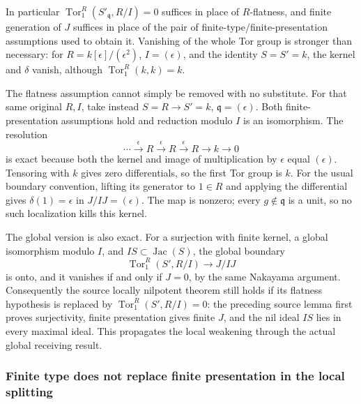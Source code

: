 In particular \(\operatorname{Tor}_1^R(S'_{\mathfrak q},R/I)=0\) suffices in place of \(R\)-flatness, and finite generation of \(J\) suffices in place of the pair of finite-type/finite-presentation assumptions used to obtain it. Vanishing of the whole Tor group is stronger than necessary: for \(R=k[\epsilon]/(\epsilon^2)\), \(I=(\epsilon)\), and the identity \(S=S'=k\), the kernel and \(\delta\) vanish, although \(\operatorname{Tor}_1^R(k,k)=k\).

The flatness assumption cannot simply be removed with no substitute. For that same original \(R,I\), take instead \(S=R\to S'=k\), \(\mathfrak q=(\epsilon)\). Both finite-presentation assumptions hold and reduction modulo \(I\) is an isomorphism. The resolution \[
\cdots\xrightarrow{\epsilon}R\xrightarrow{\epsilon}R
\xrightarrow{\epsilon}R\longrightarrow k\longrightarrow0
\] is exact because both the kernel and image of multiplication by \(\epsilon\) equal \((\epsilon)\). Tensoring with \(k\) gives zero differentials, so the first Tor group is \(k\). For the usual boundary convention, lifting its generator to \(1\in R\) and applying the differential gives \(\delta(1)=\epsilon\) in \(J/IJ=(\epsilon)\). The map is nonzero; every \(g\notin\mathfrak q\) is a unit, so no such localization kills this kernel.

The global version is also exact. For a surjection with finite kernel, a global isomorphism modulo \(I\), and \(IS\subset\operatorname{Jac}(S)\), the global boundary \[
\operatorname{Tor}_1^R(S',R/I)\longrightarrow J/IJ
\] is onto, and it vanishes if and only if \(J=0\), by the same Nakayama argument. Consequently the source locally nilpotent theorem still holds if its flatness hypothesis is replaced by \(\operatorname{Tor}_1^R(S',R/I)=0\): the preceding source lemma first proves surjectivity, finite presentation gives finite \(J\), and the nil ideal \(IS\) lies in every maximal ideal. This propagates the local weakening through the actual global receiving result.

\subsubsection{Finite type does not replace finite presentation in the local splitting}\label{algebra-proof-035-finite-type-does-not-replace-finite-presentation-in-the-local-splitting}


